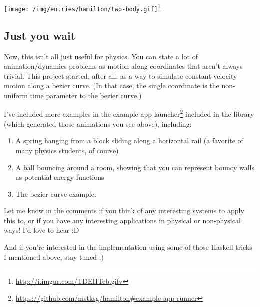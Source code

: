 \documentclass[]{article}
\renewcommand{\href}[2]{#2\footnote{\url{#1}}}
\begin{document}
\href{http://i.imgur.com/TDEHTcb.gifv}{\texttt{[image: /img/entries/hamilton/two-body.gif]}}

\hypertarget{just-you-wait}{%
\subsection{Just you wait}\label{just-you-wait}}

Now, this isn't all just useful for physics. You can state a lot of
animation/dynamics problems as motion along coordinates that aren't always
trivial. This project started, after all, as a way to simulate constant-velocity
motion along a bezier curve. (In that case, the single coordinate is the
non-uniform time parameter to the bezier curve.)

I've included more examples in the
\href{https://github.com/mstksg/hamilton\#example-app-runner}{example app
launcher} included in the library (which generated those animations you see
above), including:

\begin{enumerate}
\def\labelenumi{\arabic{enumi}.}
\tightlist
\item
  A spring hanging from a block sliding along a horizontal rail (a favorite of
  many physics students, of course)
\item
  A ball bouncing around a room, showing that you can represent bouncy walls as
  potential energy functions
\item
  The bezier curve example.
\end{enumerate}

Let me know in the comments if you think of any interesting systems to apply
this to, or if you have any interesting applications in physical or non-physical
ways! I'd love to hear :D

And if you're interested in the implementation using some of those Haskell
tricks I mentioned above, stay tuned :)
\end{document}
